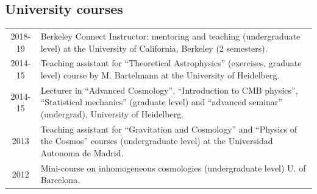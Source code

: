 \documentclass[11pt,a4paper]{article}
\begin{document}
\subsection*{University courses}
 \vspace{-.3cm}
\begin{longtable}{c p{14.5cm}}
2018-19 & {Berkeley Connect Instructor}:  mentoring and teaching (undergraduate level) at the University of California, Berkeley (2 semesters). %
\\[2pt]
2014-15 & {Teaching assistant} for ``Theoretical Astrophysics'' (exercises, graduate level) course by M. Bartelmann at the University of Heidelberg. \\[2pt]
2014-15 & {Lecturer} in  ``Advanced Cosmology'', ``Introduction to CMB physics'', ``Statistical mechanics'' (graduate level) and ``advanced seminar'' (undergrad), University of Heidelberg. \\[2pt]
2013 & {Teaching assistant} for ``Gravitation and Cosmology'' and ``Physics of the Cosmos'' courses (undergraduate level) at the Universidad Autonoma de Madrid. \\[2pt]
2012& Mini-course on inhomogeneous cosmologies (undergraduate level) U. of Barcelona.\\
\end{longtable}

\newpage
\end{document}
